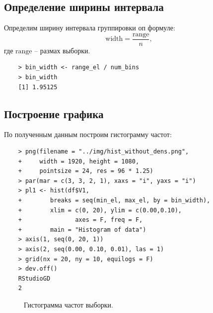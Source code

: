 \documentclass[14pt,a4paper]{scrartcl}
\begin{document}
\subsection{Определение ширины интервала}
Определим ширину интервала группировки оп формуле:
\begin{equation*}
	\text{width} = \frac{\text{range}}{n},
\end{equation*}
где $\text{range}$ -- размах выборки.


\begin{lstlisting}
	> bin_width <- range_el / num_bins
	> bin_width
	[1] 1.95125
\end{lstlisting}


\subsection{Построение графика}
По полученным данным построим гистограмму частот:


\begin{lstlisting}
	> png(filename = "../img/hist_without_dens.png", 
	+     width = 1920, height = 1080,
	+     pointsize = 24, res = 96 * 1.25)
	> par(mar = c(3, 3, 2, 1), xaxs = "i", yaxs = "i")
	> pl1 <- hist(df$V1,
	+        breaks = seq(min_el, max_el, by = bin_width), 
	+        xlim = c(0, 20), ylim = c(0.00,0.10), 
	+				axes = F, freq = F,
	+        main = "Histogram of data")
	> axis(1, seq(0, 20, 1))
	> axis(2, seq(0.00, 0.10, 0.01), las = 1)
	> grid(nx = 20, ny = 10, equilogs = F)
	> dev.off()
	RStudioGD 
	2 
\end{lstlisting}

\begin{figure}[t!]
	\caption{Гистограмма частот выборки.}
	\label{ris:hist_without_dens}
\end{figure}
\end{document}
